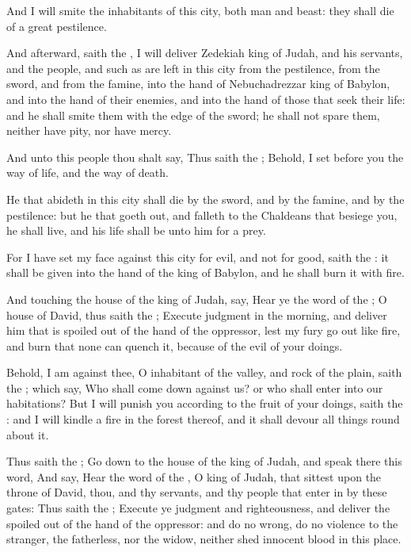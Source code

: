 \Verse And I will smite the inhabitants of this city, both man and beast: they shall die of a great pestilence.

\Verse And afterward, saith the \LORD, I will deliver Zedekiah king of Judah, and his servants, and the people, and such as are left in this city from the pestilence, from the sword, and from the famine, into the hand of Nebuchadrezzar king of Babylon, and into the hand of their enemies, and into the hand of those that seek their life: and he shall smite them with the edge of the sword; he shall not spare them, neither have pity, nor have mercy.

\Verse And unto this people thou shalt say, Thus saith the \LORD; Behold, I set before you the way of life, and the way of death.

\Verse He that abideth in this city shall die by the sword, and by the famine, and by the pestilence: but he that goeth out, and falleth to the Chaldeans that besiege you, he shall live, and his life shall be unto him for a prey.

\Verse For I have set my face against this city for evil, and not for good, saith the \LORD: it shall be given into the hand of the king of Babylon, and he shall burn it with fire.

\Verse And touching the house of the king of Judah, say, Hear ye the word of the \LORD; \Verse O house of David, thus saith the \LORD; Execute judgment in the morning, and deliver him that is spoiled out of the hand of the oppressor, lest my fury go out like fire, and burn that none can quench it, because of the evil of your doings.

\Verse Behold, I am against thee, O inhabitant of the valley, and rock of the plain, saith the \LORD; which say, Who shall come down against us? or who shall enter into our habitations?  \Verse But I will punish you according to the fruit of your doings, saith the \LORD: and I will kindle a fire in the forest thereof, and it shall devour all things round about it.


\Chapter
\Verse Thus saith the \LORD; Go down to the house of the king of Judah, and speak there this word, \Verse And say, Hear the word of the \LORD, O king of Judah, that sittest upon the throne of David, thou, and thy servants, and thy people that enter in by these gates: \Verse Thus saith the \LORD; Execute ye judgment and righteousness, and deliver the spoiled out of the hand of the oppressor: and do no wrong, do no violence to the stranger, the fatherless, nor the widow, neither shed innocent blood in this place.

